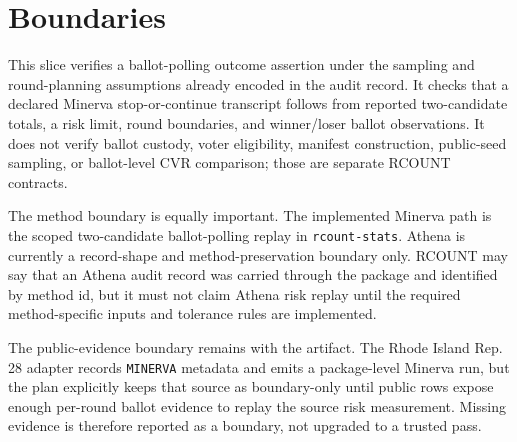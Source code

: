 \section{Boundaries}

This slice verifies a ballot-polling outcome assertion under the sampling and
round-planning assumptions already encoded in the audit record. It checks that
a declared Minerva stop-or-continue transcript follows from reported
two-candidate totals, a risk limit, round boundaries, and winner/loser ballot
observations. It does not verify ballot custody, voter eligibility, manifest
construction, public-seed sampling, or ballot-level CVR comparison; those are
separate RCOUNT contracts.

The method boundary is equally important. The implemented Minerva path is the
scoped two-candidate ballot-polling replay in \texttt{rcount-stats}. Athena is
currently a record-shape and method-preservation boundary only. RCOUNT may say
that an Athena audit record was carried through the package and identified by
method id, but it must not claim Athena risk replay until the required
method-specific inputs and tolerance rules are implemented.

The public-evidence boundary remains with the artifact. The Rhode Island Rep.
28 adapter records \texttt{MINERVA} metadata and emits a package-level
Minerva run, but the plan explicitly keeps that source as boundary-only until
public rows expose enough per-round ballot evidence to replay the source risk
measurement. Missing evidence is therefore reported as a boundary, not upgraded
to a trusted pass.
